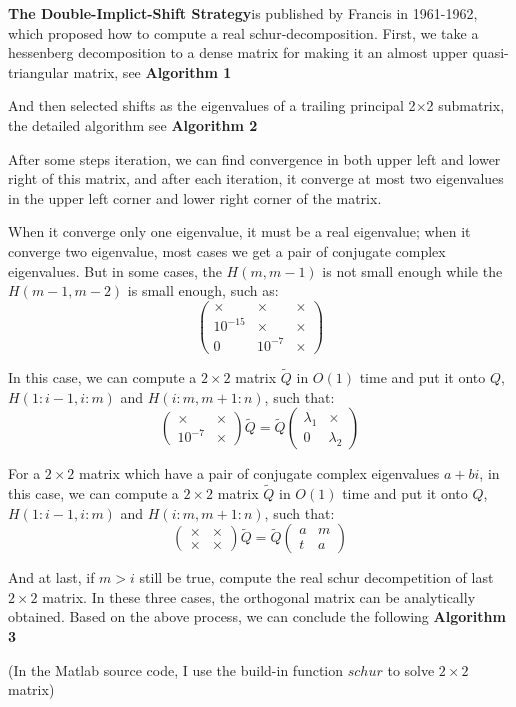 \textbf{The Double-Implict-Shift Strategy}\cite{QR1,QR2}is published by Francis in 1961-1962, which proposed how to compute a real schur-decomposition.
First, we take a hessenberg decomposition to a dense matrix for making it an almost upper quasi-triangular matrix, see \textbf{Algorithm 1}


And then selected shifts as the eigenvalues of a trailing principal 2\(\times\)2 submatrix, the detailed algorithm see \textbf{Algorithm 2}


After some steps iteration, we can find convergence in both upper left and lower right of this matrix, and after each iteration, it converge at most two eigenvalues in the upper left corner and lower right corner of the matrix.

When it converge only one eigenvalue, it must be a real eigenvalue; when it converge two eigenvalue, most cases we get a pair of conjugate complex eigenvalues. But in some cases, the \(H(m,m-1)\) is not small enough while the \(H(m-1,m-2)\) is small enough, such as:
\[\left( {\begin{array}{*{20}{c}}
 \times & \times & \times \\
{{{10}^{ - 15}}}& \times & \times \\
0&{{{10}^{ - 7}}}& \times 
\end{array}} \right)\]

In this case, we can compute a \({2 \times 2}\) matrix \({\widetilde Q}\) in \({O(1)}\) time and put it onto $Q$,\(H(1:i-1,i:m)\) and \(H(i:m,m+1:n)\), such that:
\[\left( {\begin{array}{*{20}{c}}
 \times & \times \\
{{{10}^{ - 7}}}& \times 
\end{array}} \right)\widetilde Q = \widetilde Q\left( {\begin{array}{*{20}{c}}
{{\lambda _1}}& \times \\
0&{{\lambda _2}}
\end{array}} \right)\]

For a \({2 \times 2}\) matrix which have a pair of conjugate complex eigenvalues \(a + bi\), in this case, we can compute a \({2 \times 2}\) matrix \({\widetilde Q}\) in \({O(1)}\) time and put it onto $Q$,\(H(1:i-1,i:m)\) and \(H(i:m,m+1:n)\), such that:
\[\left( {\begin{array}{*{20}{c}}
 \times & \times \\
 \times & \times 
\end{array}} \right)\widetilde Q = \widetilde Q\left( {\begin{array}{*{20}{c}}
a&m\\
t&a
\end{array}} \right)\]

And at last, if \(m>i\) still be true, compute the real schur decompetition of last \({2 \times 2}\) matrix. In these three cases, the orthogonal matrix can be analytically obtained. Based on the above process, we can conclude the following \textbf{Algorithm 3}

(In the Matlab source code, I use the build-in function \(schur\) to solve \({2 \times 2}\) matrix)